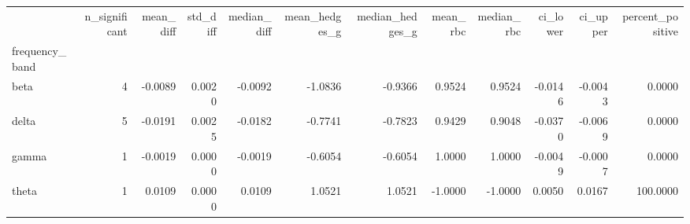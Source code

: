 \begin{tabular}{lrrrrrrrrrrr}
\toprule
 & n\_significant & mean\_diff & std\_diff & median\_diff & mean\_hedges\_g & median\_hedges\_g & mean\_rbc & median\_rbc & ci\_lower & ci\_upper & percent\_positive \\
frequency\_band &  &  &  &  &  &  &  &  &  &  &  \\
\midrule
beta & 4 & -0.0089 & 0.0020 & -0.0092 & -1.0836 & -0.9366 & 0.9524 & 0.9524 & -0.0146 & -0.0043 & 0.0000 \\
delta & 5 & -0.0191 & 0.0025 & -0.0182 & -0.7741 & -0.7823 & 0.9429 & 0.9048 & -0.0370 & -0.0069 & 0.0000 \\
gamma & 1 & -0.0019 & 0.0000 & -0.0019 & -0.6054 & -0.6054 & 1.0000 & 1.0000 & -0.0049 & -0.0007 & 0.0000 \\
theta & 1 & 0.0109 & 0.0000 & 0.0109 & 1.0521 & 1.0521 & -1.0000 & -1.0000 & 0.0050 & 0.0167 & 100.0000 \\
\bottomrule
\end{tabular}